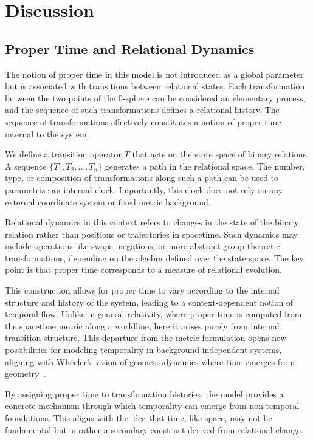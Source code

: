 \documentclass[%
 reprint,
 amsmath,amssymb,
 aps,
]{revtex4-1}
\numberwithin{equation}{section}%
\begin{document}
\section{Discussion}
\label{sec:discussion}

\subsection{Proper Time and Relational Dynamics}
\label{subsec:proper_time}

The notion of proper time in this model is not introduced as a global parameter but is associated with transitions between relational states. Each transformation between the two points of the 0-sphere can be considered an elementary process, and the sequence of such transformations defines a relational history. The sequence of transformations effectively constitutes a notion of proper time internal to the system.

We define a transition operator $T$ that acts on the state space of binary relations. A sequence $\{T_1, T_2, \ldots, T_n\}$ generates a path in the relational space. The number, type, or composition of transformations along such a path can be used to parametrize an internal clock. Importantly, this clock does not rely on any external coordinate system or fixed metric background.

Relational dynamics in this context refers to changes in the state of the binary relation rather than positions or trajectories in spacetime. Such dynamics may include operations like swaps, negations, or more abstract group-theoretic transformations, depending on the algebra defined over the state space. The key point is that proper time corresponds to a measure of relational evolution.

This construction allows for proper time to vary according to the internal structure and history of the system, leading to a context-dependent notion of temporal flow. Unlike in general relativity, where proper time is computed from the spacetime metric along a worldline, here it arises purely from internal transition structure. This departure from the metric formulation opens new possibilities for modeling temporality in background-independent systems, aligning with Wheeler's vision of geometrodynamics where time emerges from geometry~\cite{wheeler1962}.

By assigning proper time to transformation histories, the model provides a concrete mechanism through which temporality can emerge from non-temporal foundations. This aligns with the idea that time, like space, may not be fundamental but is rather a secondary construct derived from relational change.
\end{document}
